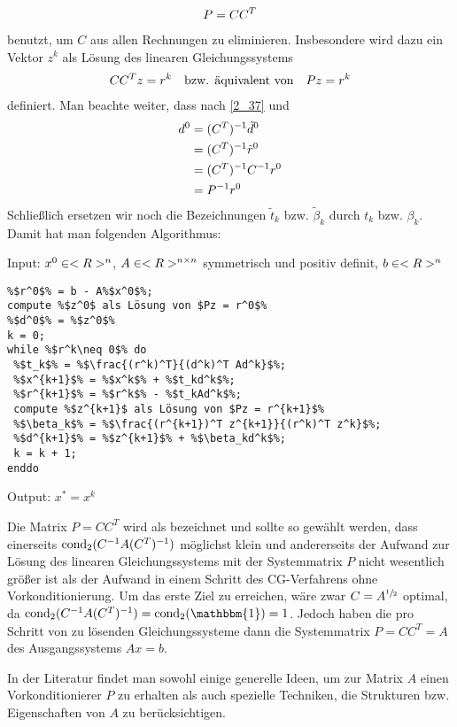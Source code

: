 \begin{align}
	P=CC^T\notag
\end{align} 
benutzt, um $C$ aus allen Rechnungen zu eliminieren. Insbesondere wird dazu ein Vektor $z^k$ als Lösung des linearen Gleichungssystems
\begin{align}
	CC^Tz=r^k\quad\text{bzw. äquivalent von}\quad Pz=r^k\notag
\end{align}
definiert. Man beachte weiter, dass nach \cref{2_37} und 
\begin{align}
	d^0&=(C^T)^{-1}\tilde{d}^0 \notag \\
	&= (C^T)^{-1}\tilde{r}^0 \notag \\
	&= (C^T)^{-1}C^{-1}r^0 \notag \\
	&= P^{-1}r^0 \notag
\end{align}
Schließlich ersetzen wir noch die Bezeichnungen $\tilde{t}_k$ bzw. $\tilde{\beta}_k$ durch $t_k$ bzw. $\beta_k$. Damit hat man folgenden Algorithmus:

\begin{algorithm}
	Input: $x^0\in<R>^n$, $A\in<R>^{n \times n}$ symmetrisch und positiv definit, $b\in<R>^n$
	\begin{lstlisting}
%$r^0$% = b - A%$x^0$%;
compute %$z^0$ als Lösung von $Pz = r^0$% 
%$d^0$% = %$z^0$%
k = 0;
while %$r^k\neq 0$% do
 %$t_k$% = %$\frac{(r^k)^T}{(d^k)^T Ad^k}$%;
 %$x^{k+1}$% = %$x^k$% + %$t_kd^k$%;
 %$r^{k+1}$% = %$r^k$% - %$t_kAd^k$%;
 compute %$z^{k+1}$ als Lösung von $Pz = r^{k+1}$%
 %$\beta_k$% = %$\frac{(r^{k+1})^T z^{k+1}}{(r^k)^T z^k}$%;
 %$d^{k+1}$% = %$z^{k+1}$% + %$\beta_kd^k$%;
 k = k + 1;
enddo
	\end{lstlisting}
	Output: $x^\ast=x^k$
\end{algorithm}

Die Matrix $P=CC^T$ wird als  bezeichnet und sollte so gewählt werden, dass einerseits $\operatorname{cond}_2(C^{-1}A(C^T)^{-1})$ möglichst klein und andererseits der Aufwand zur Lösung des linearen Gleichungssystems mit der Systemmatrix $P$ nicht wesentlich größer ist als der Aufwand in einem Schritt des CG-Verfahrens ohne Vorkonditionierung. Um das erste Ziel zu erreichen, wäre zwar $C=A^{\sfrac{1}{2}}$ optimal, da $\cond_2(C^{-1}A(C^T)^{-1})=\cond_2(\mathbbm{1})=1$. Jedoch haben die pro Schritt von  zu lösenden Gleichungssysteme dann die Systemmatrix $P=CC^T=A$ des Ausgangssystems $Ax=b$.

In der Literatur findet man sowohl einige generelle Ideen, um zur Matrix $A$ einen Vorkonditionierer $P$ zu erhalten als auch spezielle Techniken, die Strukturen bzw. Eigenschaften von $A$ zu berücksichtigen.

